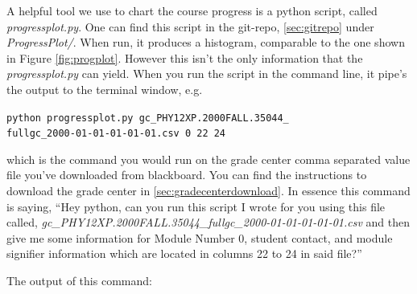 \documentclass[12pt]{article}
\begin{document}
\indent A helpful tool we use to chart the course progress is a python script, called \emph{progressplot.py}. One can find this script in the git-repo, \ref{sec:gitrepo} under \emph{ProgressPlot/}. When run, it produces a histogram, comparable to the one shown in Figure \ref{fig:progplot}. However this isn't the only information that the \emph{progressplot.py} can yield. When you run the script in the command line, it pipe's the output to the terminal window, e.g.

\begin{mdframed}[style=CommandFrame]
\texttt{python progressplot.py gc\_PHY12XP.2000FALL.35044\_ \\ fullgc\_2000-01-01-01-01-01.csv 0 22 24}
\end{mdframed}

\noindent which is the command you would run on the grade center comma separated value file you've downloaded from blackboard. You can find the instructions to download the grade center in \ref{sec:gradecenterdownload}. In essence this command is saying, ``Hey python, can you run this script I wrote for you using this file called, \emph{gc\_PHY12XP.2000FALL.35044\_fullgc\_2000-01-01-01-01-01.csv} and then give me some information for Module Number 0, student contact, and module signifier information which are located in columns 22 to 24 in said file?''

\indent The output of this command:
\end{document}
